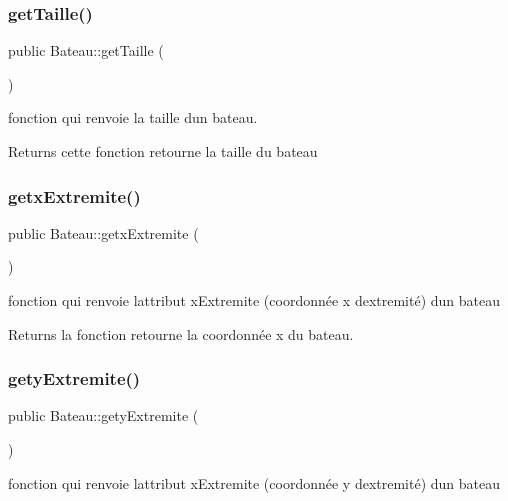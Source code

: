 \subsubsection{\texorpdfstring{get\+Taille()}{getTaille()}}
{\footnotesize\ttfamily public Bateau\+::get\+Taille (\begin{DoxyParamCaption}{ }\end{DoxyParamCaption})}



fonction qui renvoie la taille d\textquotesingle{}un bateau. 

\begin{DoxyReturn}{Returns}
cette fonction retourne la taille du bateau 
\end{DoxyReturn}
\mbox{\label{class_bateau_ad8a7212a50596757a10a429ed69400ce}} 
\subsubsection{\texorpdfstring{getx\+Extremite()}{getxExtremite()}}
{\footnotesize\ttfamily public Bateau\+::getx\+Extremite (\begin{DoxyParamCaption}{ }\end{DoxyParamCaption})}



fonction qui renvoie l\textquotesingle{}attribut x\+Extremite (coordonnée x d\textquotesingle{}extremité) d\textquotesingle{}un bateau 

\begin{DoxyReturn}{Returns}
la fonction retourne la coordonnée x du bateau. 
\end{DoxyReturn}
\mbox{\label{class_bateau_a326527275685c457dd95fd1a71924b21}} 
\subsubsection{\texorpdfstring{gety\+Extremite()}{getyExtremite()}}
{\footnotesize\ttfamily public Bateau\+::gety\+Extremite (\begin{DoxyParamCaption}{ }\end{DoxyParamCaption})}



fonction qui renvoie l\textquotesingle{}attribut x\+Extremite (coordonnée y d\textquotesingle{}extremité) d\textquotesingle{}un bateau 

